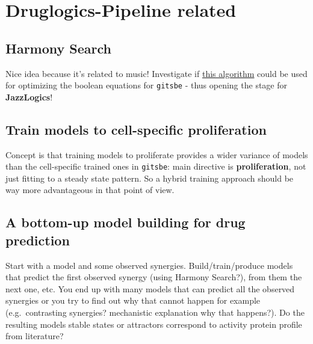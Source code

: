 \documentclass[
  12pt,
]{book}
\begin{document}
\hypertarget{druglogics-pipeline-related}{%
\section*{Druglogics-Pipeline related}\label{druglogics-pipeline-related}}

\hypertarget{harmony-search}{%
\subsection*{Harmony Search}\label{harmony-search}}

Nice idea because it's related to music!
Investigate if \href{https://doi.org/10.1016/j.proeng.2016.07.510}{this algorithm} could be used for optimizing the boolean equations for \texttt{gitsbe} - thus opening the stage for \textbf{JazzLogics}!

\hypertarget{train-models-to-cell-specific-proliferation}{%
\subsection*{Train models to cell-specific proliferation}\label{train-models-to-cell-specific-proliferation}}

Concept is that training models to proliferate provides a wider variance of models than the cell-specific trained ones in \texttt{gitsbe}: main directive is \textbf{proliferation}, not just fitting to a steady state pattern.
So a hybrid training approach should be way more advantageous in that point of view.

\hypertarget{a-bottom-up-model-building-for-drug-prediction}{%
\subsection*{A bottom-up model building for drug prediction}\label{a-bottom-up-model-building-for-drug-prediction}}

Start with a model and some observed synergies.
Build/train/produce models that predict the first observed synergy (using Harmony Search?), from them the next one, etc.
You end up with many models that can predict all the observed synergies or you try to find out why that cannot happen for example (e.g.~contrasting synergies? mechanistic explanation why that happens?).
Do the resulting models stable states or attractors correspond to activity protein profile from literature?
\end{document}
